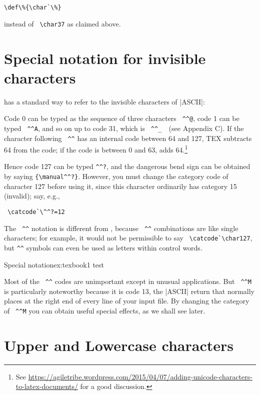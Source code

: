 \verb+\def\%{\char`\%}+

instead of \verb+ \char37+  as claimed above.

\section{Special notation for invisible characters}

\tex has a standard way to refer to the invisible characters of |ASCII|: 

Code 0 can be typed as the sequence of three characters \verb+ ^^@+, code 1 can be typed
\verb+ ^^A+, and so on up to code 31, which is \verb+ ^^_  +(see Appendix C). If the character following
\verb+ ^^+ has an internal code between 64 and 127, TEX subtracts 64 from the code; if the
code is between 0 and 63, \tex adds 64.\footnote{See \url{https://agiletribe.wordpress.com/2015/04/07/adding-unicode-characters-to-latex-documents/} for a good discussion.} 

Hence code 127 can be typed \verb+^^?+, and
the dangerous bend sign can be obtained by saying \verb+{\manual^^?}+. However, you must
change the category code of character 127 before using it, since this character ordinarily
has category 15 (invalid); say, e.g., 

\verb+ \catcode`\^^?=12 +

The \verb+ ^^+ notation is different from
\cmd{\char}, because \verb+ ^^+ combinations are like single characters; for example, it would not
be permissible to say \verb+ \catcode`\char127+, but \verb+^^+ symbols can even be used as letters within control words.

\begin{texexample}{Special notation}{ex:texbook1}
\bgroup
\panunicode
\def\^^zz{test}
\^^zz
\egroup
\end{texexample}


Most of the \verb+ ^^+ codes are unimportant except in unusual applications. But
\verb+ ^^M+ is particularly noteworthy because it is code 13, the |ASCII| return that
\tex normally places at the right end of every line of your input file. By changing the
category of \verb+ ^^M+  you can obtain useful special effects, as we shall see later.

\section{Upper and Lowercase characters}



